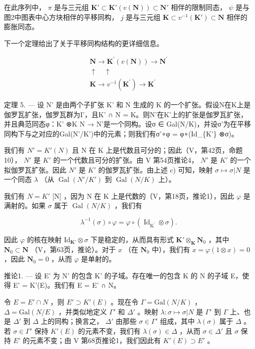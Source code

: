 在此序列中， \(\pi\) 是与三元组 \(\mathbf{K}' \subset \mathbf{K}'(v(\mathbf{N})) \subset \mathbf{N}'\) 相伴的限制同态， \(\psi\) 是与图2中图表中心方块相伴的平移同构， \(j\) 是与三元组 \(\mathbf{K} \subset v^{-1}(\mathbf{K}') \subset \mathbf{N}\) 相伴的膨胀同态。

下一个定理给出了关于平移同构结构的更详细信息。

\[
\begin{array}{c}\mathbf {N} \rightarrow \mathbf {K} ^ {\prime} (v (\mathbf {N})) \rightarrow \mathbf {N} ^ {\prime}\\\uparrow \quad \uparrow\\\mathbf {K} \rightarrow v ^ {- 1} (\mathbf {K} ^ {\prime}) \rightarrow \mathbf {K} ^ {\prime}\end{array}\tag {FIG.2.}
\]

定理 5. --- 设 N' 是由两个子扩张 K' 和 N 生成的 K 的一个扩张。假设N在K上是伽罗瓦扩张，伽罗瓦群为Γ，且K' ∩ N = K。则N'在K'上的扩张是伽罗瓦扩张，并且典范同态φ：K' ⊗K N → N'是一个同构。设σ ∈ Gal(N/K)，并设σ'为在平移同构下与之对应的Gal(N'/K')中的元素；则我们有σ'∘φ = φ∘(Id\_\{K'\} ⊗σ)。

我们有 \(N' = K'(N)\) 且 N 在 K 上是代数且可分的；因此（V，第42页，命题10）， \(N'\) 是 \(K'\) 的一个代数且可分的扩张。由 V 第54页推论4， \(N'\) 是 \(K'\) 的一个拟伽罗瓦扩张。因此 \(N'\) 是 \(K'\) 的伽罗瓦扩张。由上述 c) 可知，映射 \(\sigma \mapsto \sigma | N\) 是一个同态 \(\lambda\) （从 \(\operatorname{Gal}(N'/K')\) 到 \(\operatorname{Gal}(N/K)\) 上）。

我们有 \(N = K'\) {[}N{]} ，因为 N 在 K 上是代数的（V，第18页，推论1），因此 \(\varphi\) 是满射的。如果 \(\sigma\) 属于 \(\operatorname{Gal}(N/K)\) ，我们有

\[
\lambda^ {- 1} (\sigma) \circ \varphi = \varphi \circ \left(\operatorname{Id} _ {\mathrm{K} ^ {\prime}} \otimes \sigma\right).\tag{9}
\]

因此 \(\varphi\) 的核在映射 \(\mathrm{Id}_{\mathbf{K}'} \otimes \sigma\) 下是稳定的，从而具有形式 \(\mathbf{K}' \otimes_{\mathbf{K}} \mathbf{N}_0\) ，其中 \(\mathbf{N}_0 \subset \mathbf{N}\) （V，第63页，推论）。对于 \(x\) （在 \(\mathbf{N}_0\) 中），我们有 \(x = \varphi(1 \otimes x) = 0\) ，因此 \(\mathbf{N}_0 = 0\) ，从而 \(\varphi\) 是单射的。

推论1. --- 设 E' 为 N' 的包含 K' 的子域。存在唯一的包含 K 的 N 的子域 E，使得 E' = K'(E)。我们有 E = E' ∩ N。

令 \(E = E' \cap N\) ，则 \(E' \supset K'(E)\) 。现在令 \(\Gamma = \text{Gal}(N/K)\) ， \(\Delta = \text{Gal}(N/E)\) ，并类似地定义 \(\Gamma'\) 和 \(\Delta'\) 。映射 \(\lambda : \sigma \mapsto \sigma | N\) 是 \(\Gamma'\) 到 \(\Gamma\) 上、也是 \(\Delta'\) 到 \(\Delta\) 上的同构；换言之， \(\Delta'\) 由那些 \(\sigma \in \Gamma'\) 组成，其中 \(\lambda(\sigma)\) 属于 \(\Delta\) 。若 \(\sigma \in \Gamma'\) 保持 \(K'(E)\) 的元素不变，我们有 \(\lambda(\sigma) \in \Delta\) ，从而 \(\sigma \in \Delta'\) 且 \(\sigma\) 保持 \(E'\) 的元素不变；由 V 第68页推论1，我们因此有 \(K'(E) \supset E'\) 。

